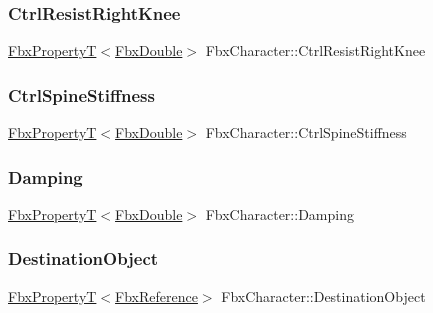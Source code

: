 \subsubsection{\texorpdfstring{Ctrl\+Resist\+Right\+Knee}{CtrlResistRightKnee}}
{\footnotesize\ttfamily \hyperlink{class_fbx_property_t}{Fbx\+PropertyT}$<$\hyperlink{fbxtypes_8h_a171e72a1c46fc15c1a6c9c31948c1c5b}{Fbx\+Double}$>$ Fbx\+Character\+::\+Ctrl\+Resist\+Right\+Knee}

\mbox{\label{class_fbx_character_af9bb40b8da6dfc8e72c4e5d735cbd1e5}} 
\subsubsection{\texorpdfstring{Ctrl\+Spine\+Stiffness}{CtrlSpineStiffness}}
{\footnotesize\ttfamily \hyperlink{class_fbx_property_t}{Fbx\+PropertyT}$<$\hyperlink{fbxtypes_8h_a171e72a1c46fc15c1a6c9c31948c1c5b}{Fbx\+Double}$>$ Fbx\+Character\+::\+Ctrl\+Spine\+Stiffness}

\mbox{\label{class_fbx_character_a05726b4bade54e987f3581ad1ec31c73}} 
\subsubsection{\texorpdfstring{Damping}{Damping}}
{\footnotesize\ttfamily \hyperlink{class_fbx_property_t}{Fbx\+PropertyT}$<$\hyperlink{fbxtypes_8h_a171e72a1c46fc15c1a6c9c31948c1c5b}{Fbx\+Double}$>$ Fbx\+Character\+::\+Damping}

\mbox{\label{class_fbx_character_a7157b8566b35af363bdacf25b912c424}} 
\subsubsection{\texorpdfstring{Destination\+Object}{DestinationObject}}
{\footnotesize\ttfamily \hyperlink{class_fbx_property_t}{Fbx\+PropertyT}$<$\hyperlink{fbxtypes_8h_a44df6a2eec915cf27cd481e5c5e48a24}{Fbx\+Reference}$>$ Fbx\+Character\+::\+Destination\+Object}

